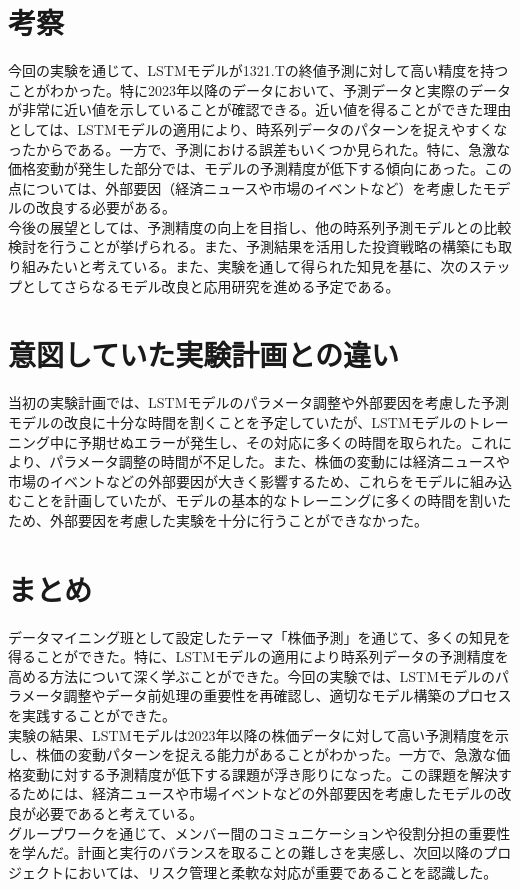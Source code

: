 \documentclass[a4paper, 11pt, titlepage]{jsarticle}
\begin{document}
\section{考察}
\indent 今回の実験を通じて、LSTMモデルが1321.Tの終値予測に対して高い精度を持つことがわかった。特に2023年以降のデータにおいて、予測データと実際のデータが非常に近い値を示していることが確認できる。近い値を得ることができた理由としては、LSTMモデルの適用により、時系列データのパターンを捉えやすくなったからである。一方で、予測における誤差もいくつか見られた。特に、急激な価格変動が発生した部分では、モデルの予測精度が低下する傾向にあった。この点については、外部要因（経済ニュースや市場のイベントなど）を考慮したモデルの改良する必要がある。\\
\indent 今後の展望としては、予測精度の向上を目指し、他の時系列予測モデルとの比較検討を行うことが挙げられる。また、予測結果を活用した投資戦略の構築にも取り組みたいと考えている。また、実験を通して得られた知見を基に、次のステップとしてさらなるモデル改良と応用研究を進める予定である。

\section{意図していた実験計画との違い}
\indent 当初の実験計画では、LSTMモデルのパラメータ調整や外部要因を考慮した予測モデルの改良に十分な時間を割くことを予定していたが、LSTMモデルのトレーニング中に予期せぬエラーが発生し、その対応に多くの時間を取られた。これにより、パラメータ調整の時間が不足した。また、株価の変動には経済ニュースや市場のイベントなどの外部要因が大きく影響するため、これらをモデルに組み込むことを計画していたが、モデルの基本的なトレーニングに多くの時間を割いたため、外部要因を考慮した実験を十分に行うことができなかった。

\section{まとめ}
\indent データマイニング班として設定したテーマ「株価予測」を通じて、多くの知見を得ることができた。特に、LSTMモデルの適用により時系列データの予測精度を高める方法について深く学ぶことができた。今回の実験では、LSTMモデルのパラメータ調整やデータ前処理の重要性を再確認し、適切なモデル構築のプロセスを実践することができた。\\
\indent 実験の結果、LSTMモデルは2023年以降の株価データに対して高い予測精度を示し、株価の変動パターンを捉える能力があることがわかった。一方で、急激な価格変動に対する予測精度が低下する課題が浮き彫りになった。この課題を解決するためには、経済ニュースや市場イベントなどの外部要因を考慮したモデルの改良が必要であると考えている。\\
\indent グループワークを通じて、メンバー間のコミュニケーションや役割分担の重要性を学んだ。計画と実行のバランスを取ることの難しさを実感し、次回以降のプロジェクトにおいては、リスク管理と柔軟な対応が重要であることを認識した。
\end{document}
